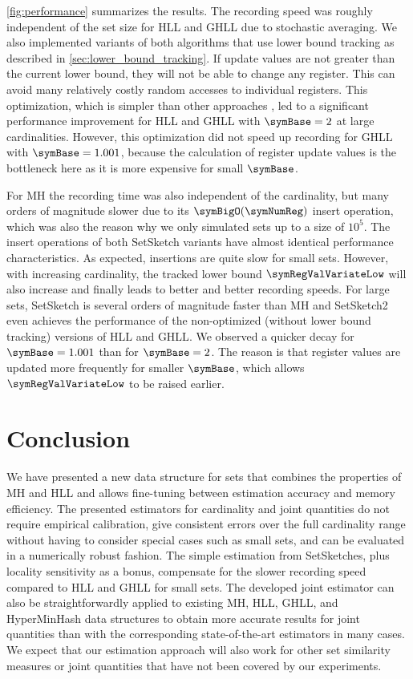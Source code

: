 \documentclass[sigconf, nonacm]{acmart}
\begin{document}
\cref{fig:performance} summarizes the results. The recording speed was roughly independent of the set size for \ac{HLL} and \ac{GHLL} due to stochastic averaging. We also implemented variants of both algorithms that use lower bound tracking as described in \cref{sec:lower_bound_tracking}. If update values are not greater than the current lower bound, they will not be able to change any register. This can avoid many relatively costly random accesses to individual registers. This optimization, which is simpler than other approaches \cite{Ertl2017, Reviriego2020}, led to a significant performance improvement for \ac{HLL} and \ac{GHLL} with $\symBase=2$ at large cardinalities. However, this optimization did not speed up recording for \ac{GHLL} with $\symBase=1.001$, because the calculation of register update values is the bottleneck here as it is more expensive for small $\symBase$.

For \ac{MH} the recording time was also independent of the cardinality, but many orders of magnitude slower due to its $\symBigO(\symNumReg)$ insert operation, which was also the reason why we only simulated sets up to a size of $10^5$.
The insert operations of both SetSketch variants have almost identical performance characteristics. As expected, insertions are quite slow for small sets. However, with increasing cardinality, the tracked lower bound $\symRegValVariateLow$ will also increase and finally leads to better and better recording speeds. For large sets, SetSketch is several orders of magnitude faster than \ac{MH} and SetSketch2 even achieves the performance of the non-optimized (without lower bound tracking) versions of \ac{HLL} and \ac{GHLL}. We observed a quicker decay for $\symBase=1.001$ than for $\symBase=2$. The reason is that register values are updated more frequently for smaller $\symBase$, which allows $\symRegValVariateLow$ to be raised earlier.

\section{Conclusion}
We have presented a new data structure for sets that combines the properties of \ac{MH} and \ac{HLL} and allows fine-tuning between estimation accuracy and memory efficiency. The presented estimators for cardinality and joint quantities do not require empirical calibration, give consistent errors over the full cardinality range without having to consider special cases such as small sets, and can be evaluated in a numerically robust fashion. The simple estimation from SetSketches, plus locality sensitivity as a bonus, compensate for the slower recording speed compared to \ac{HLL} and \ac{GHLL} for small sets. The developed joint estimator can also be straightforwardly applied to existing \ac{MH}, \ac{HLL}, \ac{GHLL}, and HyperMinHash data structures to obtain more accurate results for joint quantities than with the corresponding state-of-the-art estimators in many cases. We expect that our estimation approach will also work for other set similarity measures or joint quantities that have not been covered by our experiments.
\end{document}
